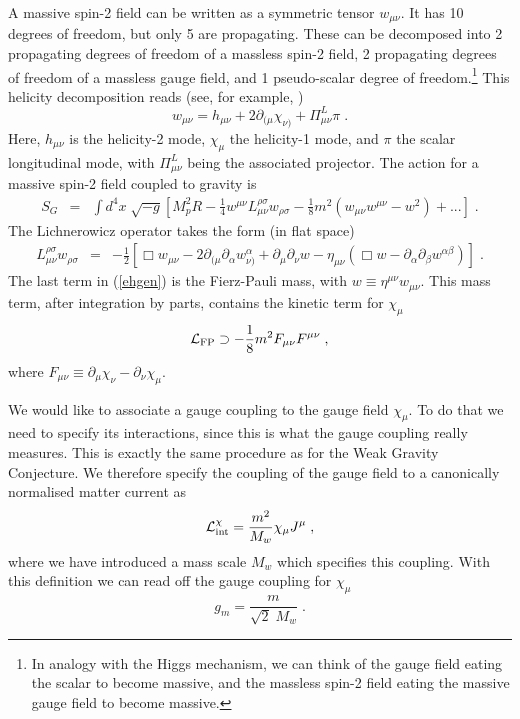 \documentclass[11pt,a4paper]{article}
\numberwithin{equation}{section}
\numberwithin{table}{section}\setlength{\multlinegap}{25pt}
\begin{document}
{A massive spin-2 field can be written as a symmetric tensor $w_{\mu\nu}$. It has 10 degrees of freedom, but only 5 are propagating. These can be decomposed into 2 propagating degrees of freedom of a massless spin-2 field, 2 propagating degrees of freedom of a massless gauge field, and 1 pseudo-scalar degree of freedom.\footnote{In analogy with the Higgs mechanism, we can think of the gauge field eating the scalar to become massive, and the massless spin-2 field eating the massive gauge field to become massive.}
This helicity decomposition reads (see, for example, \cite{Dvali:2006su})
\begin{equation} 
\label{decompo}
w_{\mu\nu} = h_{\mu\nu} + 2 \partial_{(\mu}\chi_{\nu)} + \Pi^L_{\mu\nu} \pi \;.
\end{equation} 
Here, $h_{\mu\nu}$ is the helicity-2 mode, $\chi_{\mu}$ the helicity-1 mode, and $\pi$ the scalar longitudinal mode, with $\Pi^L_{\mu\nu}$ being the associated projector. 
The action for a massive spin-2 field coupled to gravity is
\begin{eqnarray}
S_G &=& \int d^4x \; \sqrt{-g} \left[ M^2_p R  - \frac14 w^{\mu\nu} L_{\mu\nu}^{\rho\sigma} w_{\rho \sigma} -\frac18 m^2 \left( w_{\mu\nu}w^{\mu\nu} - w^2 \right) +... \right] \;. 
\label{ehgen}
\end{eqnarray}
The Lichnerowicz operator takes the form (in flat space)
\begin{eqnarray}
L_{\mu\nu}^{\rho\sigma} w_{\rho\sigma} &=& -\frac12 \left[ \Box w_{\mu\nu} - 2\partial_{(\mu}\partial_{\alpha} w^{\alpha}_{\nu)} + \partial_{\mu}\partial_{\nu} w - \eta_{\mu\nu} \left( \Box w - \partial_{\alpha} \partial_{\beta} w^{\alpha\beta}\right) \right] \;.
\end{eqnarray}
The last term in (\ref{ehgen}) is the Fierz-Pauli mass, with $w \equiv \eta^{\mu\nu}w_{\mu\nu}$. This mass term, after integration by parts, contains the kinetic term for $\chi_{\mu}$
\begin{equation}
\label{lfpfs}
{\cal L}_{\mathrm{FP}} \supset -\frac{1}{8}m^2 F_{\mu\nu} F^{\mu\nu} \;, 
\end{equation}
where $F_{\mu\nu} \equiv \partial_{\mu} \chi_{\nu} - \partial_{\nu}\chi_{\mu}$.

We would like to associate a gauge coupling to the gauge field $\chi_{\mu}$. To do that we need to specify its interactions, since this is what the gauge coupling really measures. This is exactly the same procedure as for the Weak Gravity Conjecture. We therefore specify the coupling of the gauge field to a canonically normalised matter current as
\begin{equation}
\label{h1int}
{\cal L}^{\chi}_{\mathrm{int}} =  \frac{m^2}{M_w} \chi_{\mu} J^{\mu} \;,
\end{equation}
where we have introduced a mass scale $M_w$ which specifies this coupling. With this definition we can read off the gauge coupling for $\chi_{\mu}$
\begin{equation}
\label{gdef}
g_m = \frac{m}{\sqrt{2}\;M_w} \;.
\end{equation}

}
\end{document}
